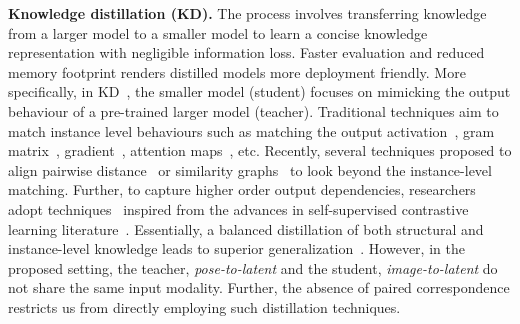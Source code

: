 \documentclass{article}
\begin{document}
\textbf{Knowledge distillation (KD).}
The process involves transferring knowledge from a larger model to a smaller model to learn a concise knowledge representation with negligible information loss. Faster evaluation and reduced memory footprint renders distilled models more deployment friendly. More specifically, in KD~\cite{hinton2015distilling}, the smaller model (student) focuses on mimicking the output behaviour of a pre-trained larger model (teacher). Traditional techniques aim to match instance level behaviours such as matching the output activation~\cite{romero2014fitnets}, gram matrix~\cite{yim2017gift}, gradient~\cite{srinivas2018knowledge}, attention maps~\cite{zagoruyko2016paying}, etc. Recently, several techniques proposed to align pairwise distance~\cite{tung2019similarity,peng2019correlation} or similarity graphs~\cite{park2019relational,liu2019knowledge} to look beyond the instance-level matching. Further, to capture higher order output dependencies, researchers adopt techniques~\cite{tian2019contrastive} inspired from the advances in self-supervised contrastive learning literature~\cite{oord2018representation,arora2019theoretical}. 
Essentially, a balanced distillation of both structural and instance-level knowledge leads to superior generalization~\cite{xu2020knowledge}. However, in the proposed setting, the teacher, \textit{pose-to-latent} and the student, \textit{image-to-latent} do not share the same input modality. Further, the absence of paired correspondence restricts us from directly employing such distillation techniques.
\end{document}
